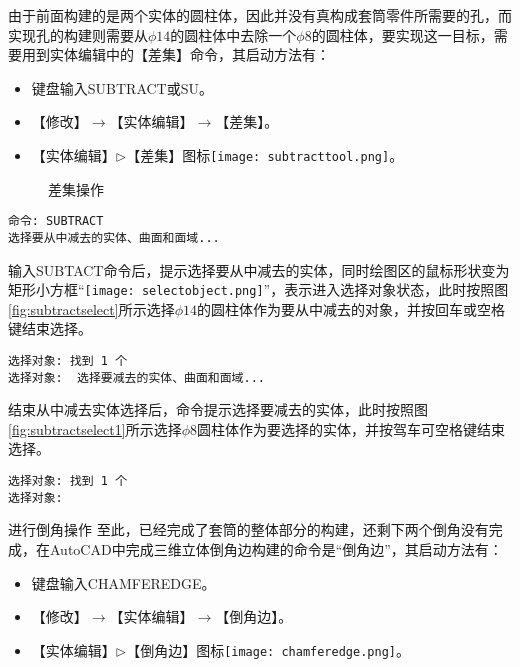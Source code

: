 \begin{procedure}
由于前面构建的是两个实体的圆柱体，因此并没有真构成套筒零件所需要的孔，而实现孔的构建则需要从$\phi 14$的圆柱体中去除一个$\phi 8$的圆柱体，要实现这一目标，需要用到实体编辑中的【差集】命令，其启动方法有：
\begin{itemize}
\item 键盘输入SUBTRACT或SU。
\item 【修改】$\rightarrow$【实体编辑】$\rightarrow$【差集】。
\item 【实体编辑】$\triangleright$【差集】图标\texttt{[image: subtracttool.png]}。
\end{itemize}
\begin{figure}[htbp]
\centering
{}\hspace{40pt}
\caption{差集操作}
\end{figure}
\begin{lstlisting}
命令: SUBTRACT
选择要从中减去的实体、曲面和面域...
\end{lstlisting}
输入SUBTACT命令后，提示选择要从中减去的实体，同时绘图区的鼠标形状变为矩形小方框“\texttt{[image: selectobject.png]}”，表示进入选择对象状态，此时按照图\ref{fig:subtractselect}所示选择$\phi 14$的圆柱体作为要从中减去的对象，并按回车或空格键结束选择。
\begin{lstlisting}
选择对象: 找到 1 个
选择对象:  选择要减去的实体、曲面和面域...
\end{lstlisting}
结束从中减去实体选择后，命令提示选择要减去的实体，此时按照图\ref{fig:subtractselect1}所示选择$\phi 8$圆柱体作为要选择的实体，并按驾车可空格键结束选择。
\begin{lstlisting}
选择对象: 找到 1 个
选择对象:
\end{lstlisting}
\item 进行倒角操作
至此，已经完成了套筒的整体部分的构建，还剩下两个倒角没有完成，在AutoCAD中完成三维立体倒角边构建的命令是“倒角边”，其启动方法有：
\begin{itemize}
\item 键盘输入CHAMFEREDGE。
\item 【修改】$\rightarrow$【实体编辑】$\rightarrow$【倒角边】。
\item 【实体编辑】$\triangleright$【倒角边】图标\texttt{[image: chamferedge.png]}。
\end{itemize}


\end{procedure}
